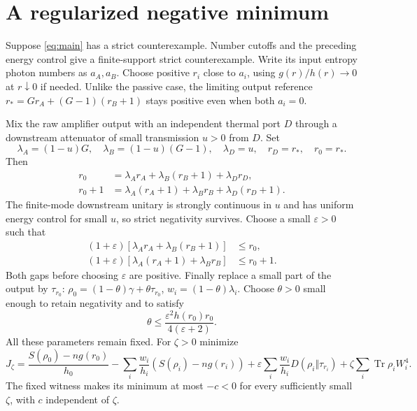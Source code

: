 \documentclass[11pt]{article}
\newcommand{\Tr}{\operatorname{Tr}}
\theoremstyle{remark}\newtheorem{remark}[theorem]{Remark}
\begin{document}
\section{A regularized negative minimum}
Suppose \eqref{eq:main} has a strict counterexample. Number cutoffs and
the preceding energy control give a finite-support strict counterexample.
Write its input entropy photon numbers as $a_A,a_B$. Choose positive
$r_i$ close to $a_i$, using $g(r)/h(r)\to0$ at $r\downarrow0$ if needed.
Unlike the passive case, the limiting output reference
$r_*=Gr_A+(G-1)(r_B+1)$ stays positive even when both $a_i=0$.

Mix the raw amplifier output with an independent thermal port $D$ through
a downstream attenuator of small transmission $u>0$ from $D$. Set
\[
 \lambda_A=(1-u)G,\quad\lambda_B=(1-u)(G-1),\quad\lambda_D=u,
 \quad r_D=r_*,\quad r_0=r_*.
\]
Then
\begin{align}
 r_0&=\lambda_A r_A+\lambda_B(r_B+1)+\lambda_Dr_D,\label{eq:balance1}\\
 r_0+1&=\lambda_A(r_A+1)+\lambda_Br_B+\lambda_D(r_D+1).\label{eq:balance2}
\end{align}
The finite-mode downstream unitary is strongly continuous in $u$ and
has uniform energy control for small $u$, so strict negativity survives.
Choose a small $\varepsilon>0$ such that
\begin{align}
 (1+\varepsilon)[\lambda_A r_A+\lambda_B(r_B+1)]&\le r_0,\label{eq:slack1}\\
 (1+\varepsilon)[\lambda_A(r_A+1)+\lambda_B r_B]&\le r_0+1.\label{eq:slack2}
\end{align}
Both gaps before choosing $\varepsilon$ are positive. Finally replace a
small part of the output by $\tau_{r_0}$:
$\rho_0=(1-\theta)\gamma+\theta\tau_{r_0}$, $w_i=(1-\theta)\lambda_i$.
Choose $\theta>0$ small enough to retain negativity and to satisfy
\begin{equation}\label{eq:theta}
 \theta\le\frac{\varepsilon^2 h(r_0)r_0}{4(\varepsilon+2)}.
\end{equation}
All these parameters remain fixed. For $\zeta>0$ minimize
\begin{equation}\label{eq:J}
 J_\zeta=\frac{S(\rho_0)-ng(r_0)}{h_0}
 -\sum_i\frac{w_i}{h_i}(S(\rho_i)-ng(r_i))
 +\varepsilon\sum_i\frac{w_i}{h_i}D(\rho_i\Vert\tau_{r_i})
 +\zeta\sum_i\Tr\rho_iW_i^4.
\end{equation}
The fixed witness makes its minimum at most $-c<0$ for every sufficiently
small $\zeta$, with $c$ independent of $\zeta$.
\end{document}
